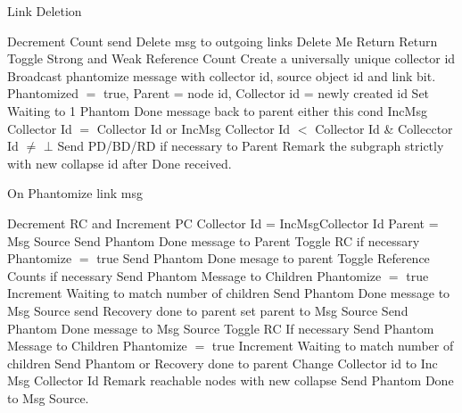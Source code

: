 \documentclass{article}
\begin{document}
\begin{algorithm}
\caption{Link Deletion}
\label{Link Deletion}
\begin{algorithmic}[1]
\State Decrement Count
\State send Delete msg to outgoing links
\EndIf
{}
\State Delete Me
\State Return
\State Return
\State Toggle Strong and Weak Reference Count
\State Create a universally unique collector id
\State Broadcast phantomize message with collector id, source object id and link bit.
\EndFor
\State Phantomized $=$ true, Parent = node id, Collector id = newly created id
\State Set Waiting to 1
\State Phantom Done message back to parent
\EndIf
\Else 
\State either this cond {IncMsg Collector Id $=$ Collector Id} or {IncMsg Collector Id $<$ Collector Id \& Collecctor Id $\neq$ $\bot$}
\State Send PD/BD/RD if necessary to Parent
\State Remark the subgraph strictly with new collapse id after Done received.
\EndIf
\EndProcedure
\end{algorithmic}
\end{algorithm}	

\begin{algorithm}
\caption{On Phantomize link msg}
\label{Phantom message received}
\begin{algorithmic}[1]
\State Decrement RC and Increment PC
\State Collector Id = IncMsgCollector Id
\State Parent = Msg Source
\State Send Phantom Done message to Parent
\State Toggle RC if necessary
\State Phantomize $=$ true
\State Send Phantom Done mesage to parent
\Else
\State Toggle Reference Counts if necessary
\State Send Phantom Message to Children
\State Phantomize $=$ true
\State Increment Waiting to match number of children
\EndIf
{}
\State Send Phantom Done message to Msg Source
\State send Recovery done to parent
\State set parent to Msg Source
\State Send Phantom Done message to Msg Source
\Else
\State Toggle RC If necessary
\State Send Phantom Message to Children
\State Phantomize $=$ true
\State Increment Waiting to match number of children
\EndIf
{}
\State Send Phantom or Recovery done to parent
\State Change Collector id to Inc Msg Collector Id
\Else
{}
\State Remark reachable nodes with new collapse
\Else
\State Send Phantom Done to Msg Source.
\EndIf
\EndIf
\EndProcedure
\end{algorithmic}
\end{algorithm}	
	
\end{document}
